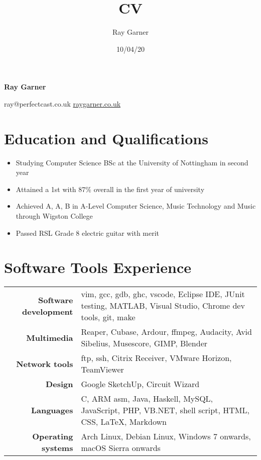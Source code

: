\documentclass{article}
\title{CV}
\date{10/04/20}
\author{Ray Garner}
\makeatletter
\renewcommand{\maketitle}{
\vskip -5cm
\begin{center}


{\huge\bfseries
Ray Garner}

\vskip 0.25cm

{\large
ray@perfectcast.co.uk\hspace{0.5cm}
\href{https://www.raygarner.co.uk}{raygarner.co.uk}}

\vskip 1cm

\end{center}
}
\makeatother
\begin{document}
\maketitle

\section{Education and Qualifications}

\begin{itemize}[noitemsep]

\renewcommand{\labelitemi}{$\square$}
\item Studying Computer Science BSc at the University of Nottingham in second year
\item Attained a 1st with 87\% overall in the first year of university
\item Achieved A, A, B in A-Level Computer Science, Music Technology and Music through Wigston College
\item Passed RSL Grade 8 electric guitar with merit

\end{itemize}

\section{Software Tools Experience}

\renewcommand{\arraystretch}{1.4}

\begin{tabular}{ r | p{11cm} }

{\large\bfseries Software development} & {vim, gcc, gdb, ghc, vscode, Eclipse IDE, JUnit testing, MATLAB, Visual Studio, Chrome dev tools, git, make}\\
{\large\bfseries Multimedia} & {Reaper, Cubase, Ardour, ffmpeg, Audacity, Avid Sibelius, Musescore, GIMP, Blender} \\
{\large\bfseries Network tools} & {ftp, ssh, Citrix Receiver, VMware Horizon, TeamViewer} \\
{\large\bfseries Design} & {Google SketchUp, Circuit Wizard} \\
{\large\bfseries Languages} & {C, ARM asm, Java, Haskell, MySQL, JavaScript, PHP, VB.NET, shell script, HTML, CSS, \LaTeX, Markdown}\\
{\large\bfseries Operating systems} & {Arch Linux, Debian Linux, Windows 7 onwards, macOS Sierra onwards}\\
\end{tabular}
\end{document}
